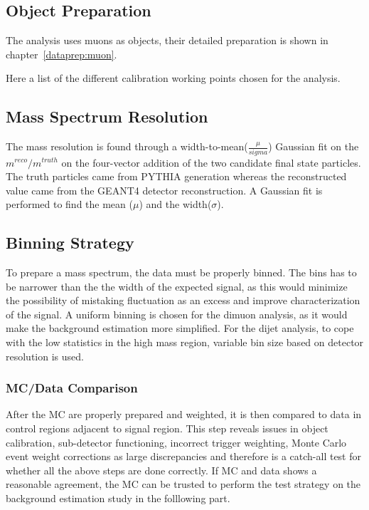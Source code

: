 

\subsection{Object Preparation}
The analysis uses muons as objects, their detailed preparation is shown in chapter~\ref{dataprep:muon}. 

Here a list of the different calibration working points chosen for the analysis.


\subsection{Mass Spectrum Resolution} 
The mass resolution is found through a width-to-mean($\frac{\mu}{sigma}$) Gaussian fit on the $m^{reco}/m^{truth}$ on the four-vector addition of the two candidate final state particles. The truth particles came from PYTHIA generation whereas the reconstructed value came from the GEANT4 detector reconstruction. A Gaussian fit is performed to find the mean ($\mu$) and the width($\sigma$).  

\subsection{Binning Strategy} 
To prepare a mass spectrum, the data must be properly binned. The bins has to be narrower than the the width of the expected signal, as this would minimize the possibility of mistaking fluctuation as an excess and improve characterization of the signal. A uniform binning is chosen for the dimuon analysis, as it would make the background estimation more simplified. For the dijet analysis, to cope with the low statistics in the high mass region, variable bin size based on detector resolution is
used. 


\subsubsection{MC/Data Comparison}
After the MC are properly prepared and weighted, it is then compared to data in control regions adjacent to signal region. This step reveals issues in object calibration, sub-detector functioning, incorrect trigger weighting, Monte Carlo event weight corrections as large discrepancies and therefore is a catch-all test for whether all the above steps are done correctly. If MC and data shows a reasonable agreement, the MC can be trusted to perform the test strategy on the
background estimation study in the folllowing part. 

